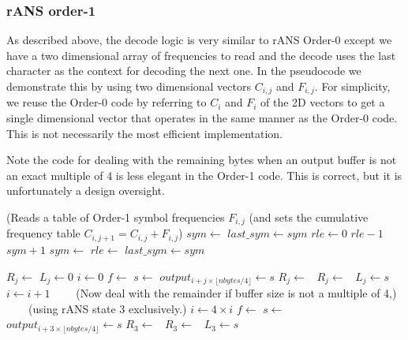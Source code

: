 \documentclass[a4paper]{article}
\begin{document}
\subsubsection*{rANS order-1}

As described above, the decode logic is very similar to rANS Order-0 except we have a two dimensional array of frequencies to read and the decode uses the last character as the context for decoding the next one.
In the pseudocode we demonstrate this by using two dimensional vectors $C_{i,j}$ and $F_{i,j}$.
For simplicity, we reuse the Order-0 code by referring to $C_i$ and $F_i$ of the 2D vectors to get a single dimensional vector that operates in the same manner as the Order-0 code.
This is not necessarily the most efficient implementation.

Note the code for dealing with the remaining bytes when an output buffer is not an exact multiple of 4 is less elegant in the Order-1 code.
This is correct, but it is unfortunately a design oversight.

\vskip 0.5cm

\begin{algorithmic}[1]
\Statex (Reads a table of Order-1 symbol frequencies $F_{i,j}$
\Statex (and sets the cumulative frequency table $C_{i,j+1} = C_{i,j}+F_{i,j}$)
\State $sym \gets$ 
\State $last\_sym \gets sym$
\State $rle \gets 0$
\Repeat
  \State {}
    \settowidth{\maxwidth}{sym}
    \State {} $rle-1$
    \State {} $sym+1$
  \Else
    \State $sym \gets$ 
      \State $rle \gets$ 
    \EndIf
  \EndIf
  \State $last\_sym \gets sym$
\EndProcedure

\Statex
{}
    \State $R_j \gets$ 
    \State $L_j \gets 0$
  \EndFor
  \State $i \gets 0$
      \State $f \gets$ 
      \State $s \gets$ 
      \State $output_{i + j \times \lfloor nbytes/4 \rfloor} \gets s$
      \State $R_j \gets$\ 
      \State $R_j \gets$\ 
      \State $L_j \gets s$
    \EndFor
    \State $i \gets i+1$
  \EndWhile
  \Statex \ \ \ \ (Now deal with the remainder if buffer size is not a multiple of 4,)
  \Statex \ \ \ \ (using rANS state 3 exclusively.)
  \State $i \gets 4 \times i$
    \State $f \gets$ 
    \State $s \gets$ 
    \State $output_{i + 3 \times \lfloor nbytes/4 \rfloor} \gets s$
    \State $R_3 \gets$\ 
    \State $R_3 \gets$\ 
    \State $L_3 \gets s$
\EndWhile
\EndProcedure
\end{algorithmic}
\end{document}
